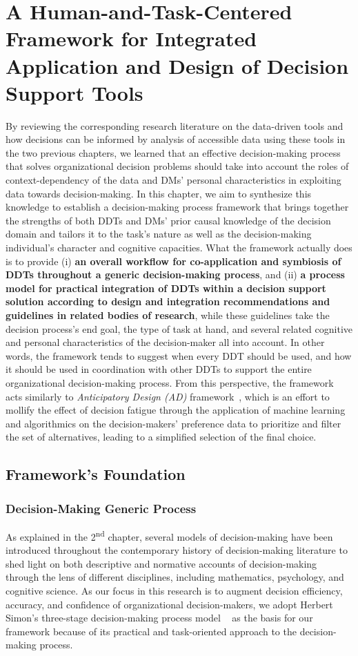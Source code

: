 \documentclass{sfuthesis}
\begin{document}
\chapter{A Human-and-Task-Centered Framework for Integrated Application and Design of Decision Support Tools}
By reviewing the corresponding research literature on the data-driven tools and how decisions can be informed by analysis of accessible data using these tools in the two previous chapters, we learned that an effective decision-making process that solves organizational decision problems should take into account the roles of context-dependency of the data and DMs’ personal characteristics in exploiting data towards decision-making. In this chapter, we aim to synthesize this knowledge to establish a decision-making process framework that brings together the strengths of both DDTs and DMs’ prior causal knowledge of the decision domain and tailors it to the task’s nature as well as the decision-making individual’s character and cognitive capacities. What the framework actually does is to provide (i) \textbf{an overall workflow for co-application and symbiosis of DDTs throughout a generic decision-making process}, and (ii) \textbf{a process model for practical integration of DDTs within a decision support solution according to design and integration recommendations and guidelines in related bodies of research}, while these guidelines take the decision process’s end goal, the type of task at hand, and several related cognitive and personal characteristics of the decision-maker all into account. In other words, the framework tends to suggest when every DDT should be used, and how it should be used in coordination with other DDTs to support the entire organizational decision-making process. From this perspective, the framework acts similarly to \textit{Anticipatory Design (AD)} framework~\cite{cerejo2020lens, cerejo2023anticipation}, which is an effort to mollify the effect of decision fatigue through the application of machine learning and algorithmics on the decision-makers’ preference data to prioritize and filter the set of alternatives, leading to a simplified selection of the final choice.
\section{Framework's Foundation}
\subsection{Decision-Making Generic Process}
As explained in the 2\textsuperscript{nd} chapter, several models of decision-making have been introduced throughout the contemporary history of decision-making literature to shed light on both descriptive and normative accounts of decision-making through the lens of different disciplines, including mathematics, psychology, and cognitive science. As our focus in this research is to augment decision efficiency, accuracy, and confidence of organizational decision-makers, we adopt Herbert Simon’s three-stage decision-making process model ~\cite{simon1960new} as the basis for our framework because of its practical and task-oriented approach to the decision-making process.\par
\end{document}
